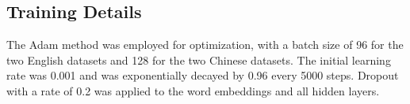 \documentclass[sigconf]{acmart}
\begin{document}
    \begin{table}[!hbt]
\caption{Statistics of the datasets that our model is tested on.}
   \centering
   \label{tab1}
   \end{table}

  \subsection{Training Details}

    The Adam method was employed for optimization, with a batch size of 96 for the two English datasets and 128 for the two Chinese datasets.
    The initial learning rate was 0.001 and was exponentially decayed by 0.96 every 5000 steps.
    Dropout with a rate of 0.2 was applied to the word embeddings and all hidden layers.
\end{document}
